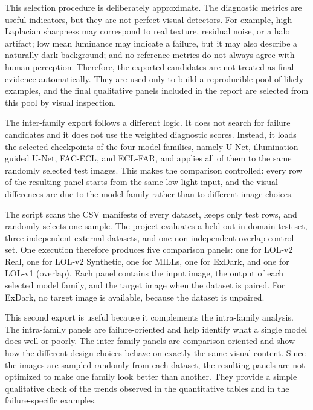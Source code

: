 This selection procedure is deliberately approximate. The diagnostic metrics are useful indicators, but they are not perfect visual detectors. For example, high Laplacian sharpness may correspond to real texture, residual noise, or a halo artifact; low mean luminance may indicate a failure, but it may also describe a naturally dark background; and no-reference metrics do not always agree with human perception. Therefore, the exported candidates are not treated as final evidence automatically. They are used only to build a reproducible pool of likely examples, and the final qualitative panels included in the report are selected from this pool by visual inspection.

The inter-family export follows a different logic. It does not search for failure candidates and it does not use the weighted diagnostic scores. Instead, it loads the selected checkpoints of the four model families, namely U-Net, illumination-guided U-Net, FAC-ECL, and ECL-FAR, and applies all of them to the same randomly selected test images. This makes the comparison controlled: every row of the resulting panel starts from the same low-light input, and the visual differences are due to the model family rather than to different image choices.

The script scans the CSV manifests of every dataset, keeps only test rows, and randomly selects one sample. The project evaluates a held-out in-domain test set, three independent external datasets, and one non-independent overlap-control set. One execution therefore produces five comparison panels: one for LOL-v2 Real, one for LOL-v2 Synthetic, one for MILLs, one for ExDark, and one for LOL-v1 (overlap). Each panel contains the input image, the output of each selected model family, and the target image when the dataset is paired. For ExDark, no target image is available, because the dataset is unpaired.

This second export is useful because it complements the intra-family analysis. The intra-family panels are failure-oriented and help identify what a single model does well or poorly. The inter-family panels are comparison-oriented and show how the different design choices behave on exactly the same visual content. Since the images are sampled randomly from each dataset, the resulting panels are not optimized to make one family look better than another. They provide a simple qualitative check of the trends observed in the quantitative tables and in the failure-specific examples.
